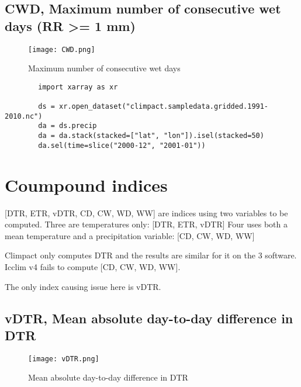 \documentclass[a4paper,11pt]{article}
\begin{document}
\subsection{CWD, Maximum number of consecutive wet days (RR >= 1 mm) }
    \begin{figure}[!hbt]
        \centering
        \texttt{[image: CWD.png]}
        \caption{Maximum number of consecutive wet days}
        \label{figure/cwd}
    \end{figure}


    \begin{lstlisting}
        import xarray as xr

        ds = xr.open_dataset("climpact.sampledata.gridded.1991-2010.nc")
        da = ds.precip
        da = da.stack(stacked=["lat", "lon"]).isel(stacked=50)
        da.sel(time=slice("2000-12", "2001-01"))
    \end{lstlisting}

\section{Coumpound indices}
    [DTR, ETR, vDTR, CD, CW, WD, WW] are indices using two variables to be computed.
    Three are temperatures only: [DTR, ETR, vDTR]
    Four uses both a mean temperature and a precipitation variable: [CD, CW, WD, WW]

    Climpact only computes DTR and the results are similar for it on the 3 software. 
    Icclim v4 fails to compute [CD, CW, WD, WW].

    The only index causing issue here is vDTR.

    \subsection{vDTR, Mean absolute day-to-day difference in DTR}
    \begin{figure}[!hbt]
        \centering
        \texttt{[image: vDTR.png]}
        \caption{Mean absolute day-to-day difference in DTR}
        \label{figure/vdtr}
    \end{figure}
\end{document}

